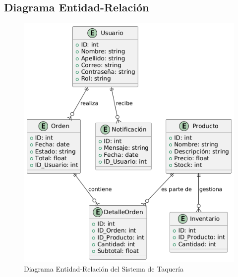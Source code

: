 \documentclass{article}
\begin{document}
\subsection{Diagrama Entidad-Relación}
\begin{figure}[H]
    \centering
    \includegraphics[width=1\textwidth]{casos/EntidadRelacion.png}
    \caption{Diagrama Entidad-Relación del Sistema de Taquería}
    \label{fig:diagrama_er}
\end{figure}
\end{document}
